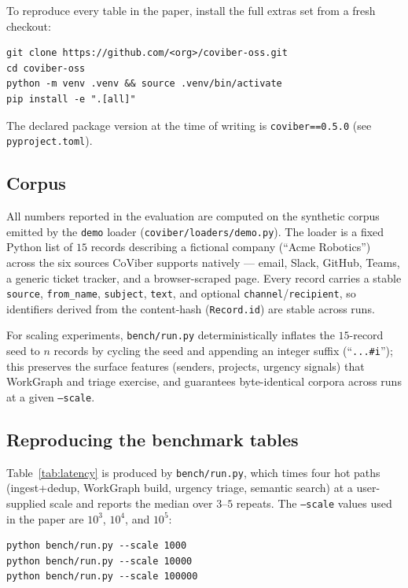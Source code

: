 To reproduce every table in the paper, install the full extras set from a
fresh checkout:

\begin{verbatim}
git clone https://github.com/<org>/coviber-oss.git
cd coviber-oss
python -m venv .venv && source .venv/bin/activate
pip install -e ".[all]"
\end{verbatim}

The declared package version at the time of writing is
\texttt{coviber==0.5.0} (see \texttt{pyproject.toml}).

\subsection{Corpus}
\label{app:corpus}

All numbers reported in the evaluation are computed on the synthetic corpus
emitted by the \texttt{demo} loader (\texttt{coviber/loaders/demo.py}). The
loader is a fixed Python list of $15$ records describing a fictional company
(``Acme Robotics'') across the six sources CoViber supports natively --- email,
Slack, GitHub, Teams, a generic ticket tracker, and a browser-scraped page.
Every record carries a stable
\texttt{source}, \texttt{from\_name}, \texttt{subject}, \texttt{text},
and optional \texttt{channel}/\texttt{recipient}, so identifiers derived from
the content-hash (\texttt{Record.id}) are stable across runs.

For scaling experiments, \texttt{bench/run.py} deterministically inflates the
$15$-record seed to $n$ records by cycling the seed and appending an integer
suffix (``\texttt{...\#i}''); this preserves the surface features (senders,
projects, urgency signals) that WorkGraph and triage exercise, and guarantees
byte-identical corpora across runs at a given \texttt{--scale}.

\subsection{Reproducing the benchmark tables}
\label{app:bench}

Table~\ref{tab:latency} is produced by \texttt{bench/run.py}, which times four
hot paths (ingest+dedup, WorkGraph build, urgency triage, semantic search) at
a user-supplied scale and reports the median over $3$--$5$ repeats. The
\texttt{--scale} values used in the paper are $10^3$, $10^4$, and $10^5$:

\begin{verbatim}
python bench/run.py --scale 1000
python bench/run.py --scale 10000
python bench/run.py --scale 100000
\end{verbatim}

